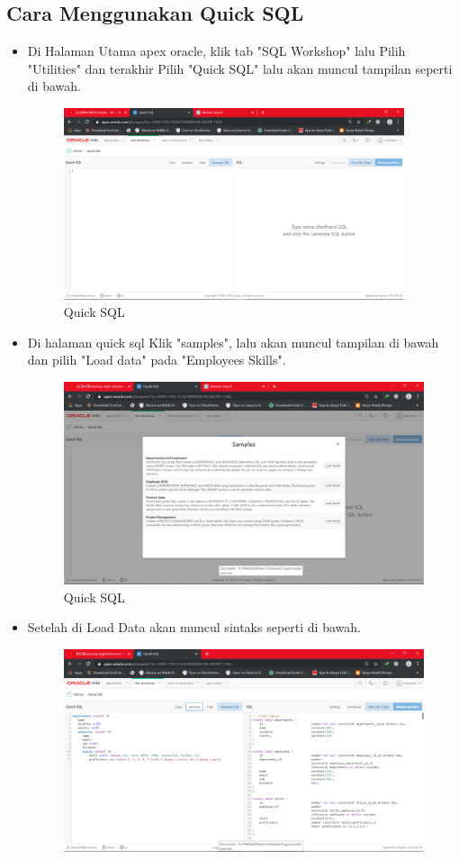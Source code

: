 \documentclass[12pt, times new roman]{article}
\begin{document}
\subsection{Cara Menggunakan Quick SQL}
\begin{itemize}
\item Di Halaman Utama apex oracle, klik tab "SQL Workshop" lalu Pilih "Utilities" dan terakhir Pilih "Quick SQL" lalu akan muncul tampilan seperti di bawah.
\begin{figure}[!htpb]
	\centering
	\includegraphics[width=10cm]{figures/Screenshot_11.png}
	\caption{Quick SQL}
\end{figure}
\item Di halaman quick sql Klik "samples", lalu akan muncul tampilan di bawah dan pilih "Load data" pada "Employees Skills".
\begin{figure}[!htpb]
	\centering
	\includegraphics[width=11cm]{figures/Screenshot_12.png}
	\caption{Quick SQL}
\end{figure}
\item Setelah di Load Data akan muncul sintaks seperti di bawah.
\begin{figure}[!htpb]
	\centering
	\includegraphics[width=12.5cm]{figures/Screenshot_13.png}

\end{figure}
\end{itemize}
\end{document}
